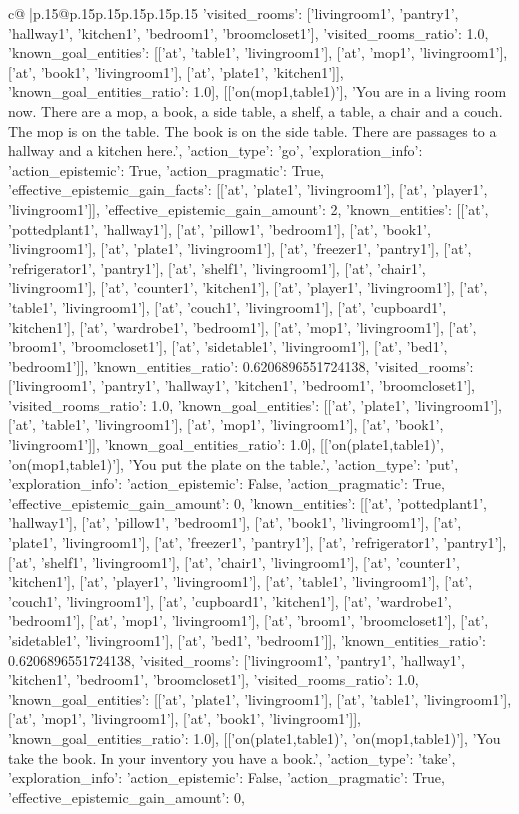 \documentclass{article}
\begin{document}
{\begin{supertabular}{c@{$\;$}|p{.15\linewidth}@{}p{.15\linewidth}p{.15\linewidth}p{.15\linewidth}p{.15\linewidth}p{.15\linewidth}}
{{{'visited_rooms': ['livingroom1', 'pantry1', 'hallway1', 'kitchen1', 'bedroom1', 'broomcloset1'], 'visited_rooms_ratio': 1.0, 'known_goal_entities': [['at', 'table1', 'livingroom1'], ['at', 'mop1', 'livingroom1'], ['at', 'book1', 'livingroom1'], ['at', 'plate1', 'kitchen1']], 'known_goal_entities_ratio': 1.0}}], [['on(mop1,table1)'], 'You are in a living room now. There are a mop, a book, a side table, a shelf, a table, a chair and a couch. The mop is on the table. The book is on the side table. There are passages to a hallway and a kitchen here.', {'action_type': 'go', 'exploration_info': {'action_epistemic': True, 'action_pragmatic': True, 'effective_epistemic_gain_facts': [['at', 'plate1', 'livingroom1'], ['at', 'player1', 'livingroom1']], 'effective_epistemic_gain_amount': 2, 'known_entities': [['at', 'pottedplant1', 'hallway1'], ['at', 'pillow1', 'bedroom1'], ['at', 'book1', 'livingroom1'], ['at', 'plate1', 'livingroom1'], ['at', 'freezer1', 'pantry1'], ['at', 'refrigerator1', 'pantry1'], ['at', 'shelf1', 'livingroom1'], ['at', 'chair1', 'livingroom1'], ['at', 'counter1', 'kitchen1'], ['at', 'player1', 'livingroom1'], ['at', 'table1', 'livingroom1'], ['at', 'couch1', 'livingroom1'], ['at', 'cupboard1', 'kitchen1'], ['at', 'wardrobe1', 'bedroom1'], ['at', 'mop1', 'livingroom1'], ['at', 'broom1', 'broomcloset1'], ['at', 'sidetable1', 'livingroom1'], ['at', 'bed1', 'bedroom1']], 'known_entities_ratio': 0.6206896551724138, 'visited_rooms': ['livingroom1', 'pantry1', 'hallway1', 'kitchen1', 'bedroom1', 'broomcloset1'], 'visited_rooms_ratio': 1.0, 'known_goal_entities': [['at', 'plate1', 'livingroom1'], ['at', 'table1', 'livingroom1'], ['at', 'mop1', 'livingroom1'], ['at', 'book1', 'livingroom1']], 'known_goal_entities_ratio': 1.0}}], [['on(plate1,table1)', 'on(mop1,table1)'], 'You put the plate on the table.', {'action_type': 'put', 'exploration_info': {'action_epistemic': False, 'action_pragmatic': True, 'effective_epistemic_gain_amount': 0, 'known_entities': [['at', 'pottedplant1', 'hallway1'], ['at', 'pillow1', 'bedroom1'], ['at', 'book1', 'livingroom1'], ['at', 'plate1', 'livingroom1'], ['at', 'freezer1', 'pantry1'], ['at', 'refrigerator1', 'pantry1'], ['at', 'shelf1', 'livingroom1'], ['at', 'chair1', 'livingroom1'], ['at', 'counter1', 'kitchen1'], ['at', 'player1', 'livingroom1'], ['at', 'table1', 'livingroom1'], ['at', 'couch1', 'livingroom1'], ['at', 'cupboard1', 'kitchen1'], ['at', 'wardrobe1', 'bedroom1'], ['at', 'mop1', 'livingroom1'], ['at', 'broom1', 'broomcloset1'], ['at', 'sidetable1', 'livingroom1'], ['at', 'bed1', 'bedroom1']], 'known_entities_ratio': 0.6206896551724138, 'visited_rooms': ['livingroom1', 'pantry1', 'hallway1', 'kitchen1', 'bedroom1', 'broomcloset1'], 'visited_rooms_ratio': 1.0, 'known_goal_entities': [['at', 'plate1', 'livingroom1'], ['at', 'table1', 'livingroom1'], ['at', 'mop1', 'livingroom1'], ['at', 'book1', 'livingroom1']], 'known_goal_entities_ratio': 1.0}}], [['on(plate1,table1)', 'on(mop1,table1)'], 'You take the book. In your inventory you have a book.', {'action_type': 'take', 'exploration_info': {'action_epistemic': False, 'action_pragmatic': True, 'effective_epistemic_gain_amount': 0, }}}
\end{supertabular}}
\end{document}
